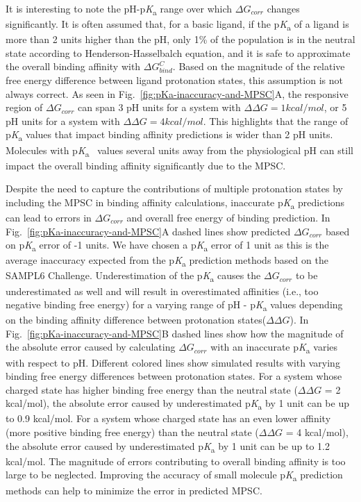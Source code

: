 \documentclass[9pt,lineno,final]{elife}
\newcommand{\pKa}{p\textit{K}\textsubscript{a}}
\begin{document}
It is interesting to note the pH-\pKa{} range over which $\Delta G_{corr}$ changes significantly.
It is often assumed that, for a basic ligand, if the \pKa{} of a ligand is more than 2 units higher than the pH, only 1\% of the population is in the neutral state according to Henderson-Hasselbalch equation, and it is safe to approximate the overall binding affinity with $\Delta G_{bind}^{C}$. 
Based on the magnitude of the relative free energy difference between ligand protonation states, this assumption is not always correct. 
As seen in Fig.~\ref{fig:pKa-inaccuracy-and-MPSC}A, the responsive region of $\Delta G_{corr}$ can span 3 pH units for a system with $\Delta\Delta G = 1 kcal/mol$, or 5 pH units for a system with $\Delta\Delta G = 4 kcal/mol$. 
This highlights that the range of \pKa{} values that impact binding affinity predictions is wider than 2 pH units. 
Molecules with \pKa{}~ values several units away from the physiological pH can still impact the overall binding affinity significantly due to the MPSC. 

Despite the need to capture the contributions of multiple protonation states by including the MPSC in binding affinity calculations, inaccurate \pKa{} predictions can lead to errors in $\Delta G_{corr}$ and overall free energy of binding prediction. 
In Fig.~\ref{fig:pKa-inaccuracy-and-MPSC}A dashed lines show predicted $\Delta G_{corr}$ based on \pKa{} error of -1 units. 
We have chosen a \pKa{} error of 1 unit as this is the average inaccuracy expected from the \pKa{} prediction methods based on the SAMPL6 Challenge.
Underestimation of the \pKa{} causes the $\Delta G_{corr}$ to be underestimated as well and will result in overestimated affinities (i.e., too negative binding free energy) for a varying range of pH - \pKa{} values depending on the binding affinity difference between protonation states($\Delta\Delta G$).
In Fig.~\ref{fig:pKa-inaccuracy-and-MPSC}B dashed lines show how the magnitude of the absolute error caused by calculating $\Delta G_{corr}$ with an inaccurate \pKa{} varies with respect to pH. 
Different colored lines show simulated results with varying binding free energy differences between protonation states. 
For a system whose charged state has higher binding free energy than the neutral state ($\Delta\Delta G$ = 2 kcal/mol), the absolute error caused by underestimated \pKa{} by 1 unit can be up to 0.9 kcal/mol.
For a system whose charged state has an even lower affinity (more positive binding free energy) than the neutral state ($\Delta\Delta G$ = 4 kcal/mol), the absolute error caused by underestimated \pKa{} by 1 unit can be up to 1.2 kcal/mol.
The magnitude of errors contributing to overall binding affinity is too large to be neglected. Improving the accuracy of small molecule \pKa{} prediction methods can help to minimize the error in predicted MPSC.
\end{document}
